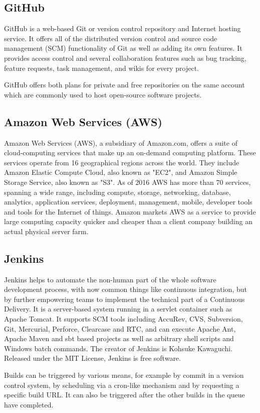 \documentclass[12pt,a4paper,oneside]{report}
\begin{document}
{\subsection{GitHub}
\par GitHub is a web-based Git or version control repository and Internet hosting service. It offers all of the distributed version control and source code management (SCM) functionality of Git as well as adding its own features. It provides access control and several collaboration features such as bug tracking, feature requests, task management, and wikis for every project.
\par
GitHub offers both plans for private and free repositories on the same account which are commonly used to host open-source software projects. 
\subsection{Amazon Web Services (AWS)}
\par Amazon Web Services (AWS), a subsidiary of Amazon.com, offers a suite of cloud-computing services that make up an on-demand computing platform. These services operate from 16 geographical regions across the world. They include Amazon Elastic Compute Cloud, also known as "EC2", and Amazon Simple Storage Service, also known as "S3". As of 2016 AWS has more than 70 services, spanning a wide range, including compute, storage, networking, database, analytics, application services, deployment, management, mobile, developer tools and tools for the Internet of things. Amazon markets AWS as a service to provide large computing capacity quicker and cheaper than a client company building an actual physical server farm.\\
\subsection{Jenkins}
\par Jenkins helps to automate the non-human part of the whole software development process, with now common things like continuous integration, but by further empowering teams to implement the technical part of a Continuous Delivery. It is a server-based system running in a servlet container such as Apache Tomcat. It supports SCM tools including AccuRev, CVS, Subversion, Git, Mercurial, Perforce, Clearcase and RTC, and can execute Apache Ant, Apache Maven and sbt based projects as well as arbitrary shell scripts and Windows batch commands. The creator of Jenkins is Kohsuke Kawaguchi. Released under the MIT License, Jenkins is free software.
\par
Builds can be triggered by various means, for example by commit in a version control system, by scheduling via a cron-like mechanism and by requesting a specific build URL. It can also be triggered after the other builds in the queue have completed.
\par

}
\end{document}
